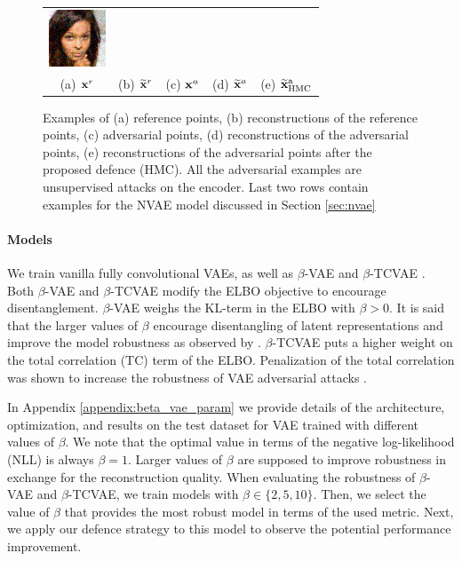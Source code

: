 \begin{figure}
\begin{tabular}{ccccc}
        \includegraphics[width=0.1\linewidth]{pics/3_adv_att/celeba_adv_rec_hmc_2.png}\\
        (a) ${\mathbf{x}}^r$ & (b) $\widetilde{{\mathbf{x}}}^r$ & (c) ${\mathbf{x}}^a$ & (d) $\widetilde{{\mathbf{x}}}^a$ & (e) $\widetilde{{\mathbf{x}}}^\text{a}_{\text{HMC}}$ \\
    \end{tabular}
    \caption{Examples of (a) reference points, (b) reconstructions of the reference points, (c) adversarial points, (d) reconstructions of the adversarial points, (e) reconstructions of the adversarial points after the proposed defence (HMC). All the adversarial examples are unsupervised attacks on the encoder. Last two rows contain examples for the NVAE model discussed in Section \protect\ref{sec:nvae}}
    \label{fig:adversarial_examples}
    \vspace*{\baselineskip}
\end{figure}


\paragraph{Models}
We train vanilla fully convolutional VAEs, as well as $\beta$-VAE \cite{higgins2016beta} and $\beta$-TCVAE \cite{chen2018isolating, kim2018disentangling}. Both $\beta$-VAE and $\beta$-TCVAE modify the ELBO objective to encourage disentanglement. $\beta$-VAE weighs the KL-term in the ELBO with $\beta > 0$. It is said that the larger values of $\beta$ encourage disentangling of latent representations \cite{chen2018isolating} and improve the model robustness as observed by \cite{camuto2021towards}. $\beta$-TCVAE puts a higher weight on the total correlation (TC) term of the ELBO. Penalization of the total correlation was shown to increase the robustness of VAE adversarial attacks \cite{Willetts2019-mu}.

In Appendix \ref{appendix:beta_vae_param} we provide details of the architecture, optimization, and results on the test dataset for VAE trained with different values of $\beta$. 
We note that the optimal value in terms of the negative log-likelihood (NLL) is always $\beta=1$. Larger values of $\beta$ are supposed to improve robustness in exchange for the reconstruction quality. When evaluating the robustness of $\beta$-VAE and $\beta$-TCVAE, we train models with $\beta \in \{2, 5, 10\}$. Then, we select the value of $\beta$ that provides the most robust model in terms of the used metric. Next, we apply our defence strategy to this model to observe the potential performance improvement. 


